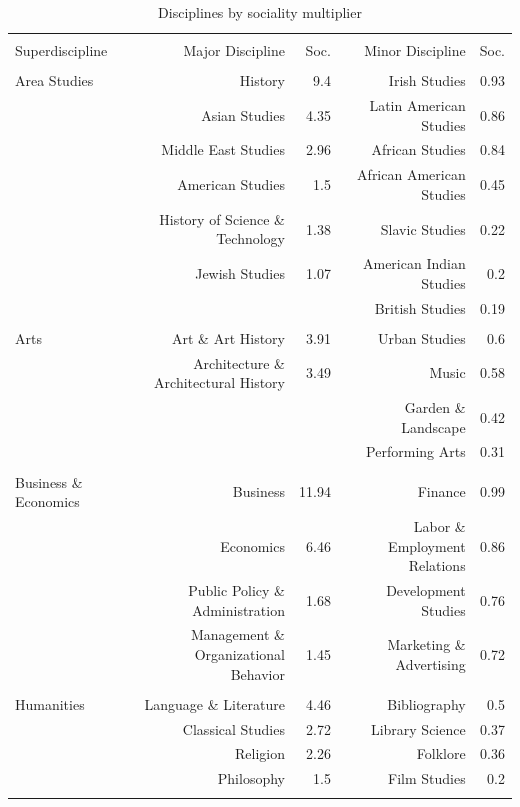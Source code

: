 \documentclass[]{book}
\theoremstyle{definition}
\theoremstyle{definition}
\theoremstyle{definition}
\theoremstyle{remark}
\begin{document}
\begin{table}[!htbp] \centering 
  \caption{Disciplines by sociality multiplier} 
  \label{tab:jclum} 
\begin{tabular}{@{\extracolsep{5pt}} lrrrr} 
\\[-1.8ex]\hline 
\hline \\[-1.8ex] 
Superdiscipline & Major Discipline & Soc. & Minor Discipline & Soc.  \\ 
\hline \\[-1.8ex] 
Area Studies & History & 9.4 & Irish Studies & 0.93 \\ 
 & Asian Studies & 4.35 & Latin American Studies & 0.86 \\ 
 & Middle East Studies & 2.96 & African Studies & 0.84 \\ 
 & American Studies & 1.5 & African American Studies & 0.45 \\ 
 & History of Science \& Technology & 1.38 & Slavic Studies & 0.22 \\ 
 & Jewish Studies & 1.07 & American Indian Studies & 0.2 \\ 
 &  &  & British Studies & 0.19 \\ 
 &  &  &  &  \\ 
Arts & Art \& Art History & 3.91 & Urban Studies & 0.6 \\ 
 & Architecture \& Architectural History & 3.49 & Music & 0.58 \\ 
 &  &  & Garden \& Landscape & 0.42 \\ 
 &  &  & Performing Arts & 0.31 \\ 
 &  &  &  &  \\ 
Business \& Economics & Business & 11.94 & Finance & 0.99 \\ 
 & Economics & 6.46 & Labor \& Employment Relations & 0.86 \\ 
 & Public Policy \& Administration & 1.68 & Development Studies & 0.76 \\ 
 & Management \& Organizational Behavior & 1.45 & Marketing \& Advertising & 0.72 \\ 
 &  &  &  &  \\ 
Humanities & Language \& Literature & 4.46 & Bibliography & 0.5 \\ 
 & Classical Studies & 2.72 & Library Science & 0.37 \\ 
 & Religion & 2.26 & Folklore & 0.36 \\ 
 & Philosophy & 1.5 & Film Studies & 0.2 \\ 
 &  &  &  &  \\ 

\end{tabular}
\end{table}
\end{document}
